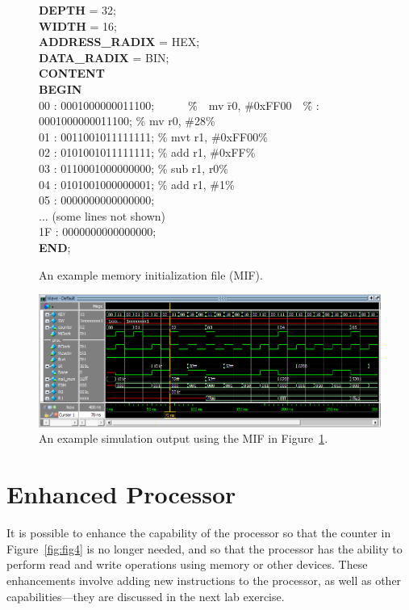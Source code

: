 \documentclass[epsfig,10pt,fullpage]{article}
\begin{document}
\begin{figure}[H]
\begin{center}
\begin{minipage}[t]{12.5 cm}
\begin{tabbing}
{\bf DEPTH} = 32;\\
{\bf WIDTH} = 16;\\
{\bf ADDRESS\_RADIX} = HEX;\\
{\bf DATA\_RADIX} = BIN;\\
{\bf CONTENT}\\
{\bf BEGIN}\\
00	:	0001000000011100;~~~~~~\=\%~~mv  \=r0, \#0xFF00~~\=\% 	:	0001000000011100;	\>\% mv \>r0, \#28\>\%\\
01	:	0011001011111111; \>\% mvt \>r1, \#0xFF00\>\%\\
02	:	0101001011111111;	\>\% add  \>r1, \#0xFF\>\%\\
03	:	0110001000000000;	\>\% sub  \>r1, r0\>\%\\
04	:	0101001000000001;	\>\% add  \>r1, \#1\>\%\\
05	:	0000000000000000;\\
$\ldots$ (some lines not shown)\\
1F :	0000000000000000;\\
{\bf END};
\end{tabbing}
\end{minipage}
\end{center}
\caption{An example memory initialization file (MIF).}
\label{fig:fig_MIF}
\end{figure}

\begin{figure}[H]
	\begin{center}
		\includegraphics[scale=1.0]{figures/figure8.png}
	\end{center}
	\caption{An example simulation output using the MIF in Figure~\ref{fig:fig_MIF}.}
	\label{fig:fig_sim2}
\end{figure}

\section*{Enhanced Processor}
It is possible to enhance the capability of the processor so that the counter in 
Figure~\ref{fig:fig4} is no longer needed, and so that the processor has the ability to 
perform read and write operations using memory or other devices. These enhancements involve 
adding new instructions to the processor, as well as other capabilities---they are
discussed in the next lab exercise.
\end{document}
